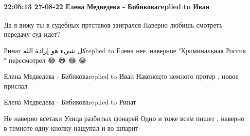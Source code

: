  
 
 
 
 

\paragraph{22:05:13 27-08-22 Елена Медведева - Бибиковаreplied to Иван}
Да я вижу ты в судебных пртставов заигрался Наверно любишь смотреть передачу суд идет?

Ринат كل شيء هو إرادة اللهreplied to Елена
нее. наверное "Криминальная Россия " пересмотрел 😂 😂 😂 😂

Елена Медведева - Бибиковаreplied to Иван
Наконецто немного протер , новое прислал

Елена Медведева - Бибиковаreplied to Ринат

Не наверно всетаки Улица разбитых фонарей Одно и тоже всем пишет , наверно в
темноте одну кнопку нащупал и во шпарит
